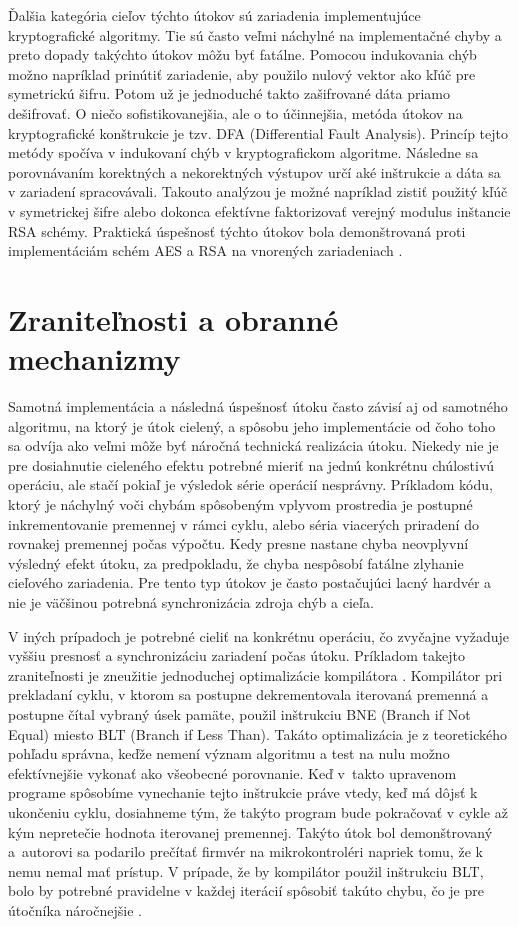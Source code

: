 Ďalšia kategória cieľov týchto útokov sú zariadenia implementujúce kryptografické algoritmy. Tie sú často veľmi náchylné na implementačné chyby a preto dopady takýchto útokov môžu byť fatálne. Pomocou indukovania chýb možno napríklad prinútiť zariadenie, aby použilo nulový vektor ako kľúč pre symetrickú šifru. Potom už je jednoduché takto zašifrované dáta priamo dešifrovať. O niečo sofistikovanejšia, ale o to účinnejšia, metóda útokov na kryptografické konštrukcie je tzv. DFA (Differential Fault Analysis). Princíp tejto metódy spočíva v indukovaní chýb v kryptografickom algoritme. Následne sa porovnávaním korektných a nekorektných výstupov určí aké inštrukcie a dáta sa v zariadení spracovávali. Takouto analýzou je možné napríklad zistiť použitý kľúč v symetrickej šifre alebo dokonca efektívne faktorizovať verejný modulus inštancie RSA schémy. Praktická úspešnosť týchto útokov bola demonštrovaná proti implementáciám schém AES a RSA na vnorených zariadeniach \cite{crypto}.

\section{Zraniteľnosti a obranné mechanizmy}
Samotná implementácia a následná úspešnosť útoku často závisí aj od samotného algoritmu, na ktorý je útok cielený, a spôsobu jeho implementácie od čoho toho sa odvíja ako veľmi môže byť náročná technická realizácia útoku. Niekedy nie je pre dosiahnutie cieleného efektu potrebné mieriť na jednú konkrétnu chúlostivú operáciu, ale stačí pokiaľ je výsledok série operácií nesprávny. Príkladom kódu, ktorý je náchylný voči chybám spôsobeným vplyvom prostredia je postupné inkrementovanie premennej v rámci cyklu, alebo séria viacerých priradení do rovnakej premennej počas výpočtu. Kedy presne nastane chyba neovplyvní výsledný efekt útoku, za predpokladu, že chyba nespôsobí fatálne zlyhanie cieľového zariadenia. Pre tento typ útokov je často postačujúci lacný hardvér a nie je väčšinou potrebná synchronizácia zdroja chýb a cieľa.

V iných prípadoch je potrebné cieliť na konkrétnu operáciu, čo zvyčajne vyžaduje vyššiu presnosť a synchronizáciu zariadení počas útoku. Príkladom takejto zraniteľnosti je zneužitie jednoduchej optimalizácie kompilátora \cite{AntiFI}. Kompilátor pri prekladaní cyklu, v ktorom sa postupne dekrementovala iterovaná premenná a postupne čítal vybraný úsek pamäte, použil inštrukciu BNE (Branch if Not Equal) miesto BLT (Branch if Less Than). Takáto optimalizácia je z teoretického pohľadu správna, keďže nemení význam algoritmu a test na nulu možno efektívnejšie vykonať ako všeobecné porovnanie. Keď v~takto upravenom programe spôsobíme vynechanie tejto inštrukcie práve vtedy, keď má dôjsť k ukončeniu cyklu, dosiahneme tým, že takýto program bude pokračovať v cykle až kým nepretečie hodnota iterovanej premennej. Takýto útok bol demonštrovaný a~autorovi sa podarilo prečítať firmvér na mikrokontroléri napriek tomu, že k nemu nemal mať prístup. V prípade, že by kompilátor použil inštrukciu BLT, bolo by potrebné pravidelne v každej iterácií spôsobiť takúto chybu, čo je pre útočníka náročnejšie \cite{AntiFI}.

